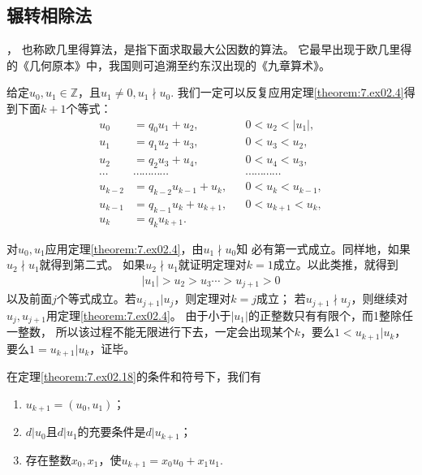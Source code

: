\subsection{辗转相除法}\label{sub:辗转相除法}
，
也称{\sffamily 欧几里得算法}，是指下面求取最大公因数的算法。
它最早出现于欧几里得的《几何原本》中，我国则可追溯至约东汉出现的《九章算术》。
\begin{theorem}\label{theorem:7.ex02.18}
    给定$u_0,u_1\in\mathbb{Z}$，且$u_1\neq0,u_1\nmid u_0$.
    我们一定可以反复应用定理\ref{theorem:7.ex02.4}得到下面$k+1$个等式：
    \begin{align}\label{eq:7.ex02.EuclideanAlgorithm}
        u_0     & =q_0u_1+u_2,             &  & 0<u_2<|u_1|,\nonumber    \\
        u_1     & =q_1u_2+u_3,             &  & 0<u_3<u_2,\nonumber      \\
        u_2     & =q_2u_3+u_4,             &  & 0<u_4<u_3,\nonumber      \\
        \cdots  & \cdots\cdots\cdots\cdots &  & \cdots\cdots\cdots\cdots \\
        u_{k-2} & =q_{k-2}u_{k-1}+u_k,     &  & 0<u_k<u_{k-1},\nonumber  \\
        u_{k-1} & =q_{k-1}u_k+u_{k+1},     &  & 0<u_{k+1}<u_k,\nonumber  \\
        u_k     & =q_ku_{k+1}.             &  & \nonumber
    \end{align}
\end{theorem}
\begin{prove}
    对$u_0,u_1$应用定理\ref{theorem:7.ex02.4}，由$u_1\nmid u_0$知
    必有第一式成立。同样地，如果$u_2\nmid u_1$就得到第二式。
    如果$u_2\nmid u_1$就证明定理对$k=1$成立。以此类推，就得到
    \begin{align}
        |u_1|>u_2>u_3\cdots>u_{j+1}>0
    \end{align}
    以及前面$j$个等式成立。若$u_{j+1}|u_j$，则定理对$k=j$成立；
    若$u_{j+1}\nmid u_j$，则继续对$u_j,u_{j+1}$用定理\ref{theorem:7.ex02.4}。
    由于小于$|u_1|$的正整数只有有限个，而1整除任一整数，
    所以该过程不能无限进行下去，一定会出现某个$k$，要么$1<u_{k+1}|u_k$，
    要么$1=u_{k+1}|u_k$，证毕。
\end{prove}
\begin{theorem}\label{theorem:7.ex02.19}
    在定理\ref{theorem:7.ex02.18}的条件和符号下，我们有
    \begin{enumerate}
        \item $u_{k+1}=(u_0,u_1)$；
        \item $d|u_0$且$d|u_1$的充要条件是$d|u_{k+1}$；
        \item 存在整数$x_0,x_1$，使$u_{k+1}=x_0u_0+x_1u_1$.
    \end{enumerate}
\end{theorem}
